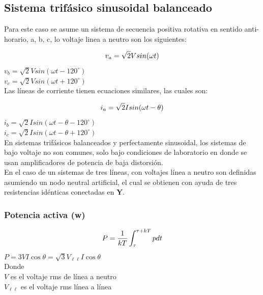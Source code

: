 \subsection{Sistema trifásico sinusoidal balanceado }

Para este caso se asume un sistema de secuencia positiva rotativa en sentido anti-horario, a, b, c, lo voltaje linea a neutro son los siguientes:

\begin{equation}\label{EQ35}
v_{a}=\sqrt{2}V sin(\omega t)\\
\end{equation} 
$v_{b}=\sqrt{2}V sin(\omega t-120^{\circ})$\\
$v_{c}=\sqrt{2}V sin(\omega t+120^{\circ})$\\

Las líneas de corriente tienen ecuaciones similares, las cuales son:

\begin{equation}\label{EQ36}
i_{a}=\sqrt{2}I sin(\omega t-\theta)\\
\end{equation} 
$i_{b}=\sqrt{2}I sin(\omega t-\theta -120^{\circ})$\\
$i_{c}=\sqrt{2}I sin(\omega t-\theta +120^{\circ})$\\

En sistemas trifásicos balanceados y perfectamente sinusoidal, los sistemas de bajo voltaje no son comunes, solo bajo condiciones de laboratorio en donde se usan amplificadores de potencia de baja distorsión.\cite{A30}\\

En el caso de un sistemas de tres líneas, con voltajes línea a neutro son definidas asumiendo un nodo neutral artificial, el cual se obtienen con ayuda de tres resistencias idénticas conectadas en \textbf{Y}.

\subsubsection{Potencia activa (w)} 
\begin{equation}\label{Eq37}
P=\frac{1}{kT}\int_{\tau}^{\tau +kT}pdt\\
\end{equation}
$P=3VI\cos\theta=\sqrt{3}V_{\ell \ell}I\cos\theta$\\
Donde\\
$V$              es el voltaje rms de línea a neutro\\
$V_{\ell \ell}$  es el voltaje rms línea a línea\\

